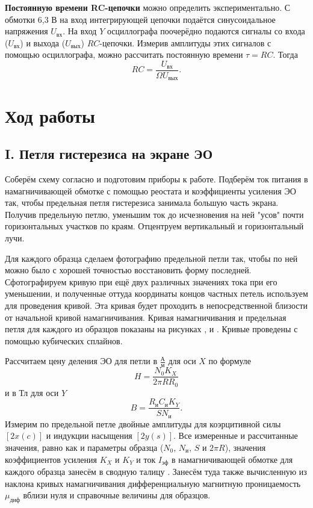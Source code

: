 \documentclass[a4paper, 12pt]{article}
\begin{document}
\textbf{Постоянную времени RC-цепочки} можно определить экспериментально. С обмотки 6,3 В на вход интегрирующей цепочки подаётся синусоидальное напряжения $U_{\text{вх}}$. На вход $Y$ осциллографа поочерёдно подаются сигналы со входа ($U_{\text{вх}}$) и выхода ($U_{\text{вых}}$) $RC$-цепочки. Измерив амплитуды этих сигналов с помощью осциллографа, можно рассчитать постоянную времени $\tau=RC$. Тогда\[RC=\frac{U_{\text{вх}}}{\Omega U_{\text{вых}}}.\]

\section*{Ход работы}

\subsection*{I. Петля гистерезиса на экране ЭО}

Соберём схему согласно  и подготовим приборы к работе. Подберём ток питания в намагничивающей обмотке с помощью реостата и коэффициенты усиления ЭО так, чтобы предельная петля гистерезиса занимала большую часть экрана. Получив предельную петлю, уменьшим ток до исчезновения на ней "усов"  \text{--} почти горизонтальных участков по краям. Отцентруем вертикальный и горизонтальный лучи.

Для каждого образца сделаем фотографию предельной петли так, чтобы по ней можно было с хорошей точностью восстановить форму последней. Сфотографируем кривую при ещё двух различных значениях тока при его уменьшении, и полученные оттуда координаты концов частных петель используем для проведения кривой. Эта кривая будет проходить в непосредственной близости от начальной кривой намагничивания. Кривая намагничивания и предельная петля для каждого из образцов показаны на рисунках ,  и . Кривые проведены с помощью кубических сплайнов.

Рассчитаем цену деления ЭО для петли в $\frac{\text{А}}{\text{м}}$ для оси $X$ по формуле\[H=\frac{N_0K_X}{2\pi RR_0}\]и в $\text{Тл}$ для оси $Y$ \[B=\frac{R_{\text{и}}C_{\text{и}}K_Y}{SN_{\text{и}}}.\]Измерим по предельной петле двойные амплитуды для коэрцитивной силы $\left[2x\left(c\right)\right]$ и индукции насыщения $\left[2y\left(s\right)\right]$. Все измеренные и рассчитанные значения, равно как и параметры образца ($N_0$, $N_{\text{и}}$, $S$ и $2\pi R$), значения коэффициентов усиления $K_X$ и $K_Y$ и ток $I_{\text{эф}}$ в намагничивающей обмотке для каждого образца занесём в сводную талицу . Занесём туда также вычисленную из наклона кривых намагничивания дифференциальную магнитную проницаемость $\mu_{\text{диф}}$ вблизи нуля и справочные величины для образцов.
\end{document}
